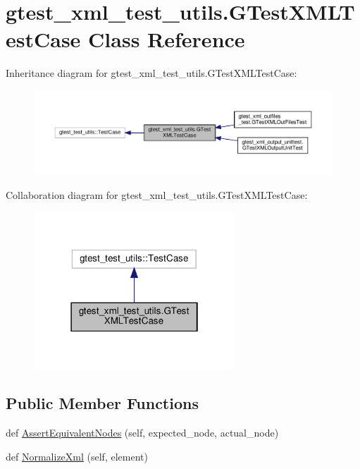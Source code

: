\hypertarget{classgtest__xml__test__utils_1_1_g_test_x_m_l_test_case}{}\section{gtest\+\_\+xml\+\_\+test\+\_\+utils.\+G\+Test\+X\+M\+L\+Test\+Case Class Reference}
\label{classgtest__xml__test__utils_1_1_g_test_x_m_l_test_case}


Inheritance diagram for gtest\+\_\+xml\+\_\+test\+\_\+utils.\+G\+Test\+X\+M\+L\+Test\+Case\+:
\nopagebreak
\begin{figure}[H]
\begin{center}
\leavevmode
\includegraphics[width=350pt]{classgtest__xml__test__utils_1_1_g_test_x_m_l_test_case__inherit__graph}
\end{center}
\end{figure}


Collaboration diagram for gtest\+\_\+xml\+\_\+test\+\_\+utils.\+G\+Test\+X\+M\+L\+Test\+Case\+:
\nopagebreak
\begin{figure}[H]
\begin{center}
\leavevmode
\includegraphics[width=214pt]{classgtest__xml__test__utils_1_1_g_test_x_m_l_test_case__coll__graph}
\end{center}
\end{figure}
\subsection*{Public Member Functions}
\begin{DoxyCompactItemize}
\item 
def \hyperlink{classgtest__xml__test__utils_1_1_g_test_x_m_l_test_case_a977273e8863f4f41d121bb5a64b08d32}{Assert\+Equivalent\+Nodes} (self, expected\+\_\+node, actual\+\_\+node)
\item 
def \hyperlink{classgtest__xml__test__utils_1_1_g_test_x_m_l_test_case_ac4823e96c3b5327b25a340a3605447d9}{Normalize\+Xml} (self, element)
\end{DoxyCompactItemize}
